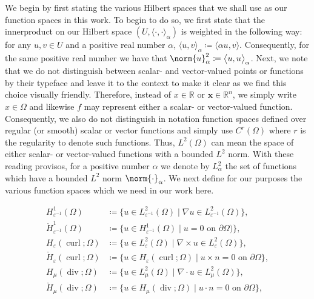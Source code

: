 \documentclass{amsart}
\theoremstyle{thmstyleone}%
\theoremstyle{thmstyletwo}%
\theoremstyle{thmstylethree}%
\def\R{\mathbb{R}}
\DeclareMathOperator{\curl}{curl}
\def\divgn{\operatorname{div}}
\newcommand{\aInnerproduct}[2]{\bigl\langle #1, #2 \bigr\rangle}
\begin{document}
We begin by first stating the various Hilbert spaces that we shall use as our function spaces in this work. To begin to do so, we first state that the innerproduct on our Hilbert space $(U, \aInnerproduct{\cdot}{\cdot}_{\alpha})$ is weighted in the following way: for any $u, v \in U$ and a positive real number $\alpha$, $\aInnerproduct{u}{v}_{\alpha} \coloneq \aInnerproduct{\alpha u}{v}$. Consequently, for the same positive real number we have that $\norm{u}_{\alpha}^2 \coloneq \aInnerproduct{u}{u}_{\alpha}$. Next, we note that we do not distinguish between scalar- and vector-valued points or functions by their typeface and leave it to the context to make it clear as we find this choice visually friendly. Therefore, instead of $x \in \R$ or $\boldsymbol{x} \in \R^n$, we simply write $x \in \Omega$ and likewise $f$ may represent either a scalar- or vector-valued function. Consequently, we also do not distinguish in notation function spaces defined over regular (or smooth) scalar or vector functions and simply use $C^r(\Omega)$ where $r$ is the regularity to denote such functions. Thus, $L^2(\Omega)$ can mean the space of either scalar- or vector-valued functions with a bounded $L^2$ norm. With these reading provisos, for a positive number $\alpha$ we denote by $L_\alpha^2$ the set of functions which have a bounded $L^2$ norm $\norm{\cdot}_{\alpha}$. We next define for our purposes the various function spaces which we need in our work here.

\begin{align*}
  H_{\varepsilon^{-1}}^1(\Omega) &\coloneq \{u \in L^2_{\varepsilon^{-1}}(\Omega) \mid \nabla u \in L^2_{\varepsilon^{-1}}(\Omega) \}, \\
  \mathring{H}_{\varepsilon^{-1}}^1(\Omega) &\coloneq \{u \in H^1_{\varepsilon^{-1}}(\Omega) \mid u = 0 \text{ on } \partial \Omega) \}, \\
  H_{\varepsilon}(\curl; \Omega) &\coloneq \{u \in L^2_\varepsilon(\Omega) \mid \nabla \times u \in L^2_\varepsilon(\Omega) \}, \\
  \mathring{H}_{\varepsilon}(\curl; \Omega) &\coloneq \{u \in H_\varepsilon(\curl; \Omega) \mid u \times n = 0 \text{ on } \partial \Omega \}, \\
  H_{\mu}(\divgn; \Omega) &\coloneq \{u \in L^2_\mu(\Omega) \mid \nabla \cdot u \in L^2_\mu(\Omega) \}, \\
  \mathring{H}_{\mu}(\divgn; \Omega) &\coloneq \{u \in H_\mu(\divgn; \Omega) \mid u \cdot n = 0 \text{ on } \partial \Omega \},
\end{align*}
\end{document}
